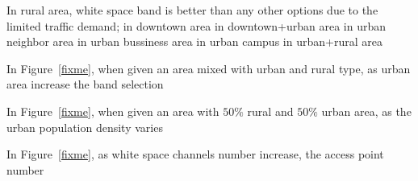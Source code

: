 In rural area, white space band is better than any other options due to the limited traffic demand;
in downtown area
in downtown+urban area
in urban neighbor area
in urban bussiness area
in urban campus
in urban+rural area

In Figure~\ref{fixme}, when given an area mixed with urban and rural type, as urban area increase
the band selection

In Figure~\ref{fixme}, when given an area with $50\%$ rural and $50\%$ urban area, as the urban 
population density varies

In Figure~\ref{fixme}, as white space channels number increase, the access point number





